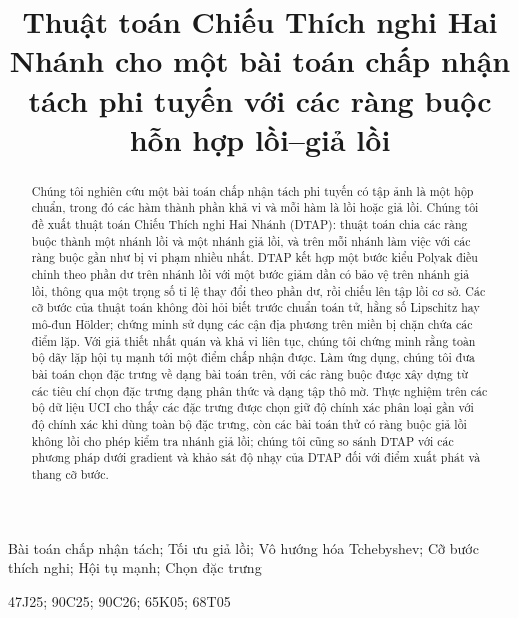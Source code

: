 \documentclass[]{interact}
\theoremstyle{plain}
\theoremstyle{definition}
\theoremstyle{remark}
\begin{document}
\title{Thuật toán Chiếu Thích nghi Hai Nhánh cho một bài toán chấp nhận tách phi tuyến với các ràng buộc hỗn hợp lồi--giả lồi}

\author{
}

\maketitle

\begin{abstract}
Chúng tôi nghiên cứu một bài toán chấp nhận tách phi tuyến có tập ảnh là một hộp chuẩn, trong đó các hàm thành phần khả vi và mỗi hàm là lồi hoặc giả lồi. Chúng tôi đề xuất thuật toán Chiếu Thích nghi Hai Nhánh (DTAP): thuật toán chia các ràng buộc thành một nhánh lồi và một nhánh giả lồi, và trên mỗi nhánh làm việc với các ràng buộc gần như bị vi phạm nhiều nhất. DTAP kết hợp một bước kiểu Polyak điều chỉnh theo phần dư trên nhánh lồi với một bước giảm dần có bảo vệ trên nhánh giả lồi, thông qua một trọng số tỉ lệ thay đổi theo phần dư, rồi chiếu lên tập lồi cơ sở. Các cỡ bước của thuật toán không đòi hỏi biết trước chuẩn toán tử, hằng số Lipschitz hay mô-đun H\"older; chứng minh sử dụng các cận địa phương trên miền bị chặn chứa các điểm lặp. Với giả thiết nhất quán và khả vi liên tục, chúng tôi chứng minh rằng toàn bộ dãy lặp hội tụ mạnh tới một điểm chấp nhận được. Làm ứng dụng, chúng tôi đưa bài toán chọn đặc trưng về dạng bài toán trên, với các ràng buộc được xây dựng từ các tiêu chí chọn đặc trưng dạng phân thức và dạng tập thô mờ. Thực nghiệm trên các bộ dữ liệu UCI cho thấy các đặc trưng được chọn giữ độ chính xác phân loại gần với độ chính xác khi dùng toàn bộ đặc trưng, còn các bài toán thử có ràng buộc giả lồi không lồi cho phép kiểm tra nhánh giả lồi; chúng tôi cũng so sánh DTAP với các phương pháp dưới gradient và khảo sát độ nhạy của DTAP đối với điểm xuất phát và thang cỡ bước.
\end{abstract}

\begin{keywords}
Bài toán chấp nhận tách; Tối ưu giả lồi; Vô hướng hóa Tchebyshev; Cỡ bước thích nghi; Hội tụ mạnh; Chọn đặc trưng
\end{keywords}
\begin{amscode}
47J25; 90C25; 90C26; 65K05; 68T05
\end{amscode}
\end{document}
